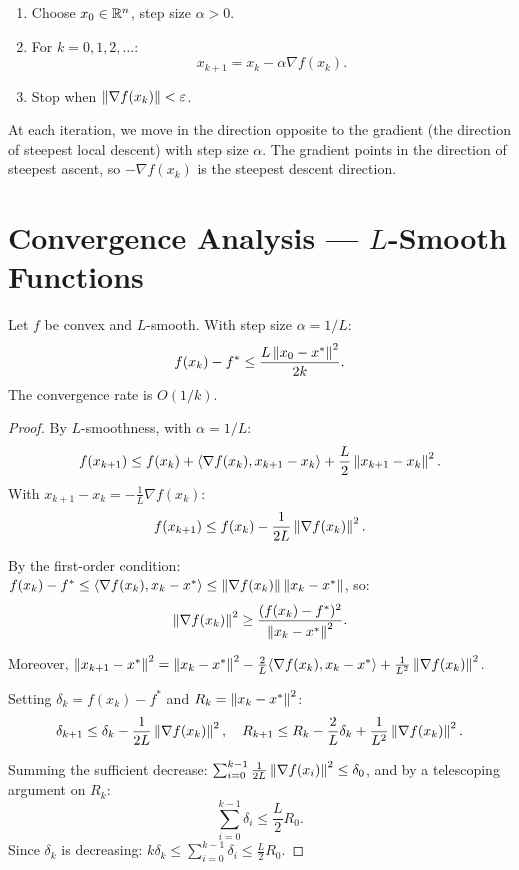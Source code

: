\begin{algorithme}[title=\textbf{Gradient Descent}]
\begin{enumerate}
    \item Choose $x_0 \in \mathbb{R}^n$, step size $\alpha > 0$.
    \item For $k = 0, 1, 2, \ldots$:
    \[
        x_{k+1} = x_k - \alpha \nabla f(x_k).
    \]
    \item Stop when $\left\| \nabla f(x_k) \right\| < \varepsilon$.
\end{enumerate}
\end{algorithme}

\begin{intuition}
At each iteration, we move in the direction opposite to the gradient (the direction
of steepest local descent) with step size $\alpha$. The gradient points in the
direction of steepest ascent, so $-\nabla f(x_k)$ is the steepest descent direction.
\end{intuition}

\section{Convergence Analysis --- $L$-Smooth Functions}

\begin{theorem}
\label{thm:conv_smooth}
Let $f$ be convex and $L$-smooth. With step size $\alpha = 1/L$:
\[
    f(x_k) - f^* \leq \frac{L\left\| x_0 - x^* \right\|^2}{2k}.
\]
The convergence rate is $O(1/k)$.
\end{theorem}

\begin{proof}
By $L$-smoothness, with $\alpha = 1/L$:
\[
    f(x_{k+1}) \leq f(x_k) + \langle \nabla f(x_k), x_{k+1} - x_k \rangle + \frac{L}{2}\left\| x_{k+1} - x_k \right\|^2.
\]
With $x_{k+1} - x_k = -\frac{1}{L}\nabla f(x_k)$:
\[
    f(x_{k+1}) \leq f(x_k) - \frac{1}{2L}\left\| \nabla f(x_k) \right\|^2.
\]

By the first-order condition: $f(x_k) - f^* \leq \langle \nabla f(x_k), x_k - x^* \rangle
\leq \left\| \nabla f(x_k) \right\|\left\| x_k - x^* \right\|$, so:
\[
    \left\| \nabla f(x_k) \right\|^2 \geq \frac{(f(x_k) - f^*)^2}{\left\| x_k - x^* \right\|^2}.
\]

Moreover, $\left\| x_{k+1} - x^* \right\|^2 = \left\| x_k - x^* \right\|^2 - \frac{2}{L}\langle \nabla f(x_k), x_k - x^* \rangle + \frac{1}{L^2}\left\| \nabla f(x_k) \right\|^2$.

Setting $\delta_k = f(x_k) - f^*$ and $R_k = \left\| x_k - x^* \right\|^2$:
\[
    \delta_{k+1} \leq \delta_k - \frac{1}{2L}\left\| \nabla f(x_k) \right\|^2, \quad
    R_{k+1} \leq R_k - \frac{2}{L}\delta_k + \frac{1}{L^2}\left\| \nabla f(x_k) \right\|^2.
\]

Summing the sufficient decrease:
$\sum_{i=0}^{k-1} \frac{1}{2L}\left\| \nabla f(x_i) \right\|^2 \leq \delta_0$, and by a
telescoping argument on $R_k$:
\[
    \sum_{i=0}^{k-1} \delta_i \leq \frac{L}{2}R_0.
\]
Since $\delta_k$ is decreasing: $k\delta_k \leq \sum_{i=0}^{k-1}\delta_i \leq \frac{L}{2}R_0$.
\end{proof}

